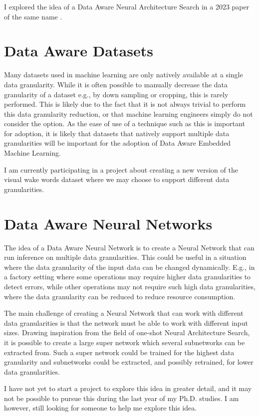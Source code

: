 \documentclass{acaces}
\begin{document}
I explored the idea of a Data Aware Neural Architecture Search in a 2023 paper of the same name \cite{njor2023data}.

\section{Data Aware Datasets}
Many datasets used in machine learning are only natively available at a single data granularity.
While it is often possible to manually decrease the data granularity of a dataset e.g., by down sampling or cropping, this is rarely performed.
This is likely due to the fact that it is not always trivial to perform this data granularity reduction, or that machine learning engineers simply do not consider the option.
As the ease of use of a technique such as this is important for adoption, it is likely that datasets that natively support multiple data granularities will be important for the adoption of Data Aware Embedded Machine Learning.

I am currently participating in a project about creating a new version of the visual wake words dataset\cite{chowdhery2019visual} where we may choose to support different data granularities.

\section{Data Aware Neural Networks}
The idea of a Data Aware Neural Network is to create a Neural Network that can run inference on multiple data granularities.
This could be useful in a situation where the data granularity of the input data can be changed dynamically.
E.g., in a factory setting where some operations may require higher data granularities to detect errors, while other operations may not require such high data granularities, where the data granularity can be reduced to reduce resource consumption.

The main challenge of creating a Neural Network that can work with different data granularities is that the network must be able to work with different input sizes.
Drawing inspiration from the field of one-shot Neural Architecture Search, it is possible to create a large super network which several subnetworks can be extracted from\cite{pham2018efficient}.
Such a super network could be trained for the highest data granularity and subnetworks could be extracted, and possibly retrained, for lower data granularities.

I have not yet to start a project to explore this idea in greater detail, and it may not be possible to pursue this during the last year of my Ph.D. studies.
I am however, still looking for someone to help me explore this idea.



\end{document}
